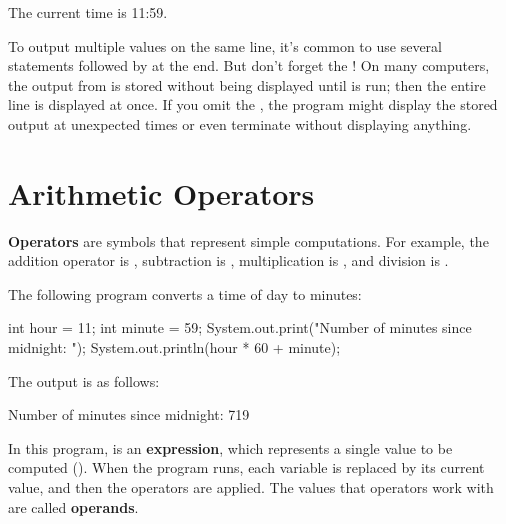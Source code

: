 \begin{stdout}
The current time is 11:59.
\end{stdout}

To output multiple values on the same line, it's common to use several  statements followed by  at the end.
But don't forget the !
On many computers, the output from  is stored without being displayed until  is run; then the entire line is displayed at once.
If you omit the , the program might display the stored output at unexpected times or even terminate without displaying anything.


\section{Arithmetic Operators}



{\bf Operators} are symbols that represent simple computations.
For example, the addition operator is \java{+}, subtraction is \java{-}, multiplication is \java{*}, and division is \java{/}.

The following program converts a time of day to minutes:

\begin{code}
int hour = 11;
int minute = 59;
System.out.print("Number of minutes since midnight: ");
System.out.println(hour * 60 + minute);
\end{code}

The output is as follows:

\begin{stdout}
Number of minutes since midnight: 719
\end{stdout}


In this program,  is an {\bf expression}, which represents a single value to be computed ().
When the program runs, each variable is replaced by its current value, and then the operators are applied.
The values that operators work with are called {\bf operands}.

